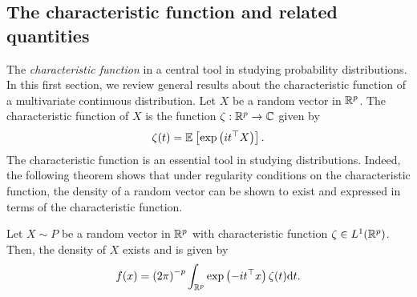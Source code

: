 \subsection{The characteristic function and related quantities}

The \textit{characteristic function} in a central tool in studying probability distributions. In this first section, we review general results about the characteristic function of a multivariate continuous distribution. Let $X$ be a random vector in $\Rp$. The characteristic function of $X$ is the function $\zeta : \Rp \rightarrow \C$ given by
\begin{equation*}
    \zeta(t) = \expec{}{\expf{it^\top X}}.
\end{equation*}
The characteristic function is an essential tool in studying distributions. Indeed, the following theorem shows that under regularity conditions on the characteristic function, the density of a random vector can be shown to exist and expressed in terms of the characteristic function.

\begin{theorem} \label{thm-char-inversion}
    Let $X \sim P$ be a random vector in $\Rp$ with characteristic function $\zeta \in L^1(\Rp)$. Then, the density of $X$ exists and is given by
    \begin{equation} \label{eq-density-via-charfun}
        f(x) = \left(2\pi\right)^{-p} \intRp{t}{ \expf{-it^\top x}\zeta(t) }.
    \end{equation}
\end{theorem}

